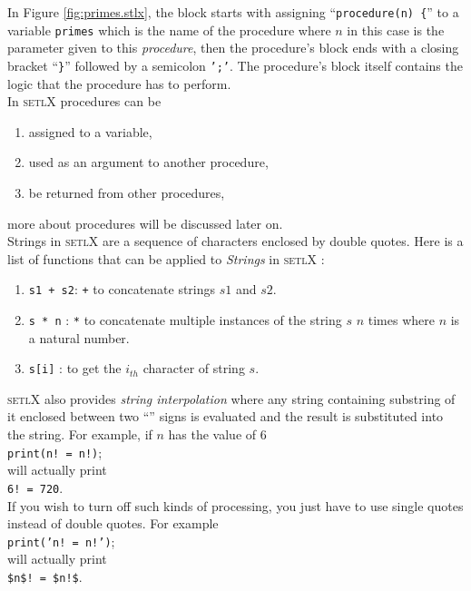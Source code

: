\documentclass[11pt]{report}
\begin{document}
In Figure \ref{fig:primes.stlx}, the block starts with assigning ``\texttt{procedure(n) \{}'' to a variable \texttt{primes} which is the name of the procedure where $n$ in this case is the parameter given to this \textsl{procedure}, then the procedure's block ends with a closing bracket ``\texttt{\}}'' followed by a semicolon \texttt{';'}. The procedure's block itself contains the logic that the procedure has to perform.\\
In \textsc{setlX} procedures can be
\begin{enumerate}
\item assigned to a variable,
\item used as an argument to another procedure,
\item be returned from other procedures,
\end{enumerate}
more about procedures will be discussed later on.
\\

Strings in \textsc{setlX} are a sequence of characters enclosed by double quotes. Here is a list of functions that can be applied to \textsl{Strings} in \textsc{setlX} :
\begin{enumerate}
\item \texttt{s1 + s2}: \texttt{+} to concatenate strings $s1$ and $s2$.
\item \texttt{s * n} : \texttt{*} to concatenate multiple instances of the string $s$ $n$ times where $n$ is a natural number.
\item \texttt{s[i]} : to get the $i_{th}$ character of string $s$.
\end{enumerate}
\textsc{setlX} also provides \textsl{string interpolation} where any string containing substring of it enclosed between two ``\texttt{}'' signs is evaluated and the result is substituted into the string. For example, if $n$ has the value of $6$
\\[0.2cm]
\hspace*{1.3cm}
\texttt{print(n! = n!)};
\\[0.2cm]
will actually print
\\[0.2cm]
\hspace*{1.3cm}
\texttt{6! = 720}.
\\[0.2cm]
If you wish to turn off such kinds of processing, you just have to use single quotes instead of double quotes. For example
\\[0.2cm]
\hspace*{1.3cm}
\texttt{print('n! = n!')};
\\[0.2cm]
will actually print
\\[0.2cm]
\hspace*{1.3cm}
\texttt{\$n\$! = \$n!\$}.
\\[0.2cm]
\\
\end{document}
